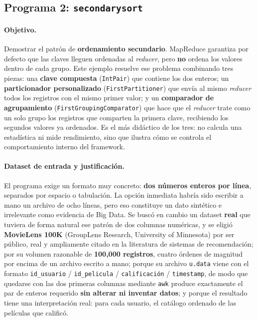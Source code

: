 \subsection{Programa 2: \texttt{secondarysort}}

\paragraph{Objetivo.} Demostrar el patrón de \textbf{ordenamiento secundario}. MapReduce garantiza por defecto que las claves lleguen ordenadas al \textit{reducer}, pero \textbf{no} ordena los valores dentro de cada grupo. Este ejemplo resuelve ese problema combinando tres piezas: una \textbf{clave compuesta} (\texttt{IntPair}) que contiene los dos enteros; un \textbf{particionador personalizado} (\texttt{FirstPartitioner}) que envía al mismo \textit{reducer} todos los registros con el mismo primer valor; y un \textbf{comparador de agrupamiento} (\texttt{FirstGroupingComparator}) que hace que el \textit{reducer} trate como un solo grupo los registros que comparten la primera clave, recibiendo los segundos valores ya ordenados. Es el más didáctico de los tres: no calcula una estadística ni mide rendimiento, sino que ilustra cómo se controla el comportamiento interno del framework.

\paragraph{Dataset de entrada y justificación.} El programa exige un formato muy concreto: \textbf{dos números enteros por línea}, separados por espacio o tabulación. La opción inmediata habría sido escribir a mano un archivo de ocho líneas, pero eso constituye un dato sintético e irrelevante como evidencia de Big Data. Se buscó en cambio un dataset \textbf{real} que tuviera de forma natural ese patrón de dos columnas numéricas, y se eligió \textbf{MovieLens 100K} (GroupLens Research, University of Minnesota) por ser público, real y ampliamente citado en la literatura de sistemas de recomendación; por su volumen razonable de \textbf{100,000 registros}, cuatro órdenes de magnitud por encima de un archivo escrito a mano; porque su archivo \texttt{u.data} viene con el formato \texttt{id\_usuario} / \texttt{id\_pelicula} / \texttt{calificación} / \texttt{timestamp}, de modo que quedarse con las dos primeras columnas mediante \texttt{awk} produce exactamente el par de enteros requerido \textbf{sin alterar ni inventar datos}; y porque el resultado tiene una interpretación real: para cada usuario, el catálogo ordenado de las películas que calificó.

